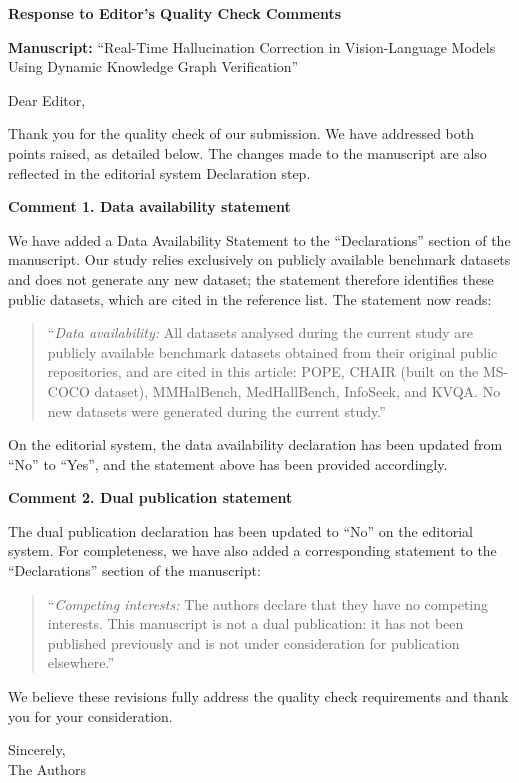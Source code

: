 \documentclass[11pt]{article}
\begin{document}
\begin{center}
{\large\bfseries Response to Editor's Quality Check Comments}
\end{center}

\vspace{0.5em}
\noindent\textbf{Manuscript:} ``Real-Time Hallucination Correction in Vision-Language
Models Using Dynamic Knowledge Graph Verification''

\vspace{1em}
\noindent Dear Editor,

Thank you for the quality check of our submission. We have addressed both points
raised, as detailed below. The changes made to the manuscript are also reflected
in the editorial system Declaration step.

\vspace{1em}
\noindent\textbf{Comment 1. Data availability statement}

We have added a Data Availability Statement to the ``Declarations'' section of the
manuscript. Our study relies exclusively on publicly available benchmark datasets
and does not generate any new dataset; the statement therefore identifies these
public datasets, which are cited in the reference list. The statement now reads:

\begin{quote}
``\emph{Data availability:} All datasets analysed during the current study are
publicly available benchmark datasets obtained from their original public
repositories, and are cited in this article: POPE, CHAIR (built on the MS-COCO
dataset), MMHalBench, MedHallBench, InfoSeek, and KVQA. No new datasets were
generated during the current study.''
\end{quote}

\noindent On the editorial system, the data availability declaration has been
updated from ``No'' to ``Yes'', and the statement above has been provided
accordingly.

\vspace{1em}
\noindent\textbf{Comment 2. Dual publication statement}

The dual publication declaration has been updated to ``No'' on the editorial
system. For completeness, we have also added a corresponding statement to the
``Declarations'' section of the manuscript:

\begin{quote}
``\emph{Competing interests:} The authors declare that they have no competing
interests. This manuscript is not a dual publication: it has not been published
previously and is not under consideration for publication elsewhere.''
\end{quote}

\vspace{1em}
\noindent We believe these revisions fully address the quality check requirements
and thank you for your consideration.

\vspace{1.5em}
\noindent Sincerely,\\
The Authors
\end{document}
